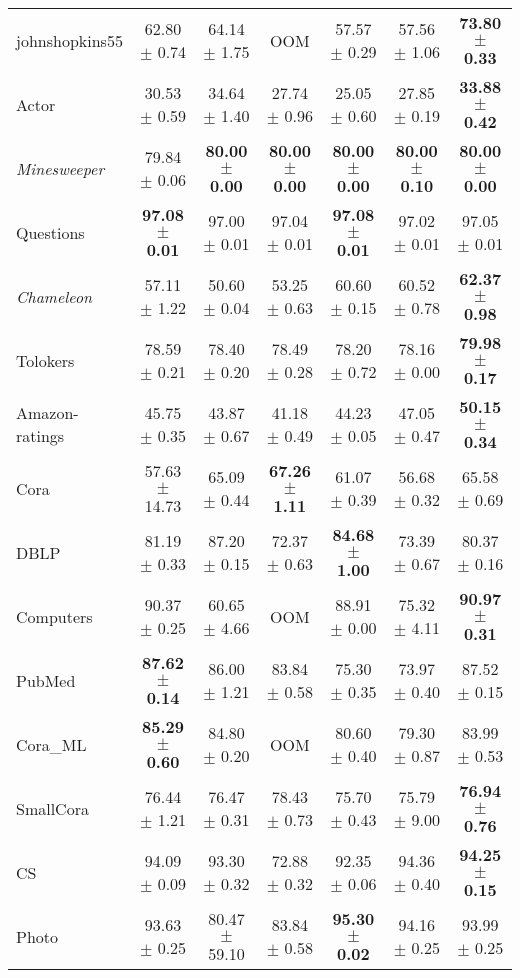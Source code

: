 \begin{table}[t]
\begin{sc}
{\begin{tabular}{@{}l|cccccc@{}}
johnshopkins55 & 62.80 $\pm$ 0.74 & 64.14 $\pm$ 1.75 & OOM & 57.57 $\pm$ 0.29 & 57.56 $\pm$ 1.06 & \textbf{73.80 $\pm$ 0.33} \\
Actor & 30.53 $\pm$ 0.59 & 34.64 $\pm$ 1.40 & 27.74 $\pm$ 0.96 & 25.05 $\pm$ 0.60 & 27.85 $\pm$ 0.19 & \textbf{33.88 $\pm$ 0.42} \\
\textit{Minesweeper} & 79.84 $\pm$ 0.06 & \textbf{80.00 $\pm$ 0.00} & \textbf{80.00 $\pm$ 0.00} & \textbf{80.00 $\pm$ 0.00} & \textbf{80.00 $\pm$ 0.10} & \textbf{80.00 $\pm$ 0.00} \\
Questions & \textbf{97.08 $\pm$ 0.01} & 97.00 $\pm$ 0.01 & 97.04 $\pm$ 0.01 & \textbf{97.08 $\pm$ 0.01} & 97.02 $\pm$ 0.01 & 97.05 $\pm$ 0.01 \\
\textit{Chameleon} & 57.11 $\pm$ 1.22 & 50.60 $\pm$ 0.04 & 53.25 $\pm$ 0.63 & 60.60 $\pm$ 0.15 & 60.52 $\pm$ 0.78 & \textbf{62.37 $\pm$ 0.98} \\
Tolokers & 78.59 $\pm$ 0.21 & 78.40 $\pm$ 0.20 & 78.49 $\pm$ 0.28 & 78.20 $\pm$ 0.72 & 78.16 $\pm$ 0.00 & \textbf{79.98 $\pm$ 0.17} \\
Amazon-ratings & 45.75 $\pm$ 0.35 & 43.87 $\pm$ 0.67 & 41.18 $\pm$ 0.49 & 44.23 $\pm$ 0.05 & 47.05 $\pm$ 0.47 & \textbf{50.15 $\pm$ 0.34} \\
Cora & 57.63 $\pm$ 14.73 & 65.09 $\pm$ 0.44 & \textbf{67.26 $\pm$ 1.11} & 61.07 $\pm$ 0.39 & 56.68 $\pm$ 0.32 & 65.58 $\pm$ 0.69 \\
DBLP & 81.19 $\pm$ 0.33 & 87.20 $\pm$ 0.15 & 72.37 $\pm$ 0.63 & \textbf{84.68 $\pm$ 1.00} & 73.39 $\pm$ 0.67 & 80.37 $\pm$ 0.16 \\
Computers & 90.37 $\pm$ 0.25 & 60.65 $\pm$ 4.66 & OOM & 88.91 $\pm$ 0.00 & 75.32 $\pm$ 4.11 & \textbf{90.97 $\pm$ 0.31} \\
PubMed & \textbf{87.62 $\pm$ 0.14} & 86.00 $\pm$ 1.21 & 83.84 $\pm$ 0.58 & 75.30 $\pm$ 0.35 & 73.97 $\pm$ 0.40 & 87.52 $\pm$ 0.15 \\\midrule \midrule 
Cora\_ML & \textbf{85.29 $\pm$ 0.60} & 84.80 $\pm$ 0.20 & OOM & 80.60 $\pm$ 0.40 & 79.30 $\pm$ 0.87 & 83.99 $\pm$ 0.53 \\
SmallCora & 76.44 $\pm$ 1.21 & 76.47 $\pm$ 0.31 & 78.43 $\pm$ 0.73 & 75.70 $\pm$ 0.43 & 75.79 $\pm$ 9.00 & \textbf{76.94 $\pm$ 0.76} \\
CS & 94.09 $\pm$ 0.09 & 93.30 $\pm$ 0.32 & 72.88 $\pm$ 0.32 & 92.35 $\pm$ 0.06 & 94.36 $\pm$ 0.40 & \textbf{94.25 $\pm$ 0.15} \\
Photo & 93.63 $\pm$ 0.25 & 80.47 $\pm$ 59.10 & 83.84 $\pm$ 0.58 & \textbf{95.30 $\pm$ 0.02} & 94.16 $\pm$ 0.25 & 93.99 $\pm$ 0.25 \\

\end{tabular}}
\end{sc}
\end{table}
